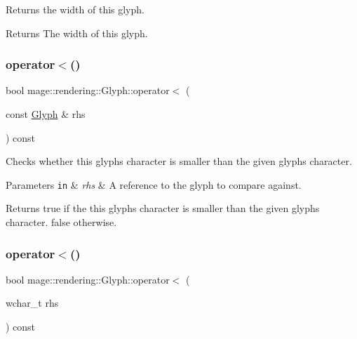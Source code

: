 Returns the width of this glyph.

\begin{DoxyReturn}{Returns}
The width of this glyph. 
\end{DoxyReturn}
\mbox{\label{structmage_1_1rendering_1_1_glyph_ae33b927cf35bde25b691310bbae6647a}} 
\subsubsection{\texorpdfstring{operator$<$()}{operator<()}\hspace{0.1cm}{\footnotesize\ttfamily [1/2]}}
{\footnotesize\ttfamily bool mage\+::rendering\+::\+Glyph\+::operator$<$ (\begin{DoxyParamCaption}\item[{const \mbox{\hyperlink{structmage_1_1rendering_1_1_glyph}{Glyph}} \&}]{rhs }\end{DoxyParamCaption}) const\hspace{0.3cm}{\ttfamily [noexcept]}}

Checks whether this glyph\textquotesingle{}s character is smaller than the given glyph\textquotesingle{}s character.


\begin{DoxyParams}[1]{Parameters}
\mbox{\tt in}  & {\em rhs} & A reference to the glyph to compare against. \\
\hline
\end{DoxyParams}
\begin{DoxyReturn}{Returns}
{\ttfamily true} if the this glyph\textquotesingle{}s character is smaller than the given glyph\textquotesingle{}s character. {\ttfamily false} otherwise. 
\end{DoxyReturn}
\mbox{\label{structmage_1_1rendering_1_1_glyph_a9c796f1884ac97a80e4bbd7476c3dfb8}} 
\subsubsection{\texorpdfstring{operator$<$()}{operator<()}\hspace{0.1cm}{\footnotesize\ttfamily [2/2]}}
{\footnotesize\ttfamily bool mage\+::rendering\+::\+Glyph\+::operator$<$ (\begin{DoxyParamCaption}\item[{wchar\+\_\+t}]{rhs }\end{DoxyParamCaption}) const\hspace{0.3cm}{\ttfamily [noexcept]}}

